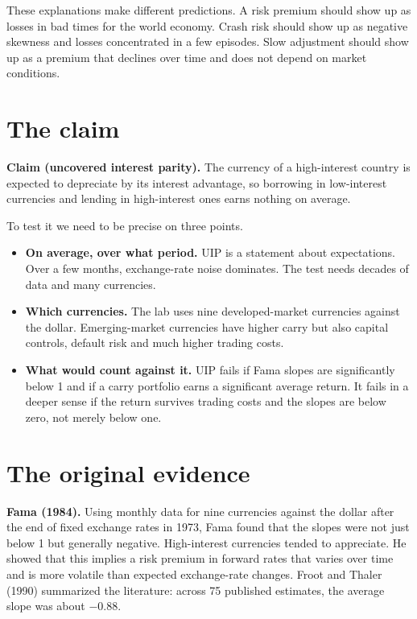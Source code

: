 These explanations make different predictions. A risk premium should show up as losses in bad times for the world economy. Crash risk should show up as negative skewness and losses concentrated in a few episodes. Slow adjustment should show up as a premium that declines over time and does not depend on market conditions.

\section{The claim}
\label{sec:11-claim}

\begin{callout}
\textbf{Claim (uncovered interest parity).} The currency of a high-interest country is expected to depreciate by its interest advantage, so borrowing in low-interest currencies and lending in high-interest ones earns nothing on average.
\end{callout}

To test it we need to be precise on three points.

\begin{itemize}
  \item \textbf{On average, over what period.} UIP is a statement about expectations. Over a few months, exchange-rate noise dominates. The test needs decades of data and many currencies.
  \item \textbf{Which currencies.} The lab uses nine developed-market currencies against the dollar. Emerging-market currencies have higher carry but also capital controls, default risk and much higher trading costs.
  \item \textbf{What would count against it.} UIP fails if Fama slopes are significantly below 1 and if a carry portfolio earns a significant average return. It fails in a deeper sense if the return survives trading costs and the slopes are below zero, not merely below one.
\end{itemize}

\section{The original evidence}
\label{sec:11-evidence}

\textbf{Fama (1984).} Using monthly data for nine currencies against the dollar after the end of fixed exchange rates in 1973, Fama found that the slopes were not just below 1 but generally negative. High-interest currencies tended to appreciate. He showed that this implies a risk premium in forward rates that varies over time and is more volatile than expected exchange-rate changes. Froot and Thaler (1990) summarized the literature: across 75 published estimates, the average slope was about $-0.88$.

